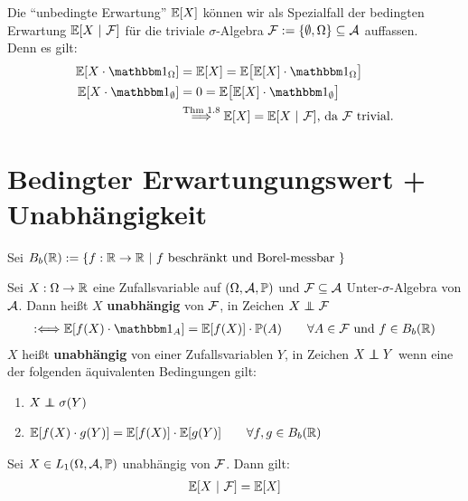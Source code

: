 \begin{bemerkung}
Die ``unbedingte Erwartung'' $\mathbb{E}[X]$ können wir als Spezialfall der bedingten Erwartung $\mathbb{E}[X~|~\mathcal{F}]$ für die triviale $\sigma$-Algebra $\mathcal{F}:=\lbrace\emptyset,\Omega\rbrace\subseteq\mathcal{A}$ auffassen.\\
Denn es gilt:
\begin{align*}
\E[X\cdot\indi_\Omega]&=\E[X]=\E\big[\E[X]\cdot\indi_\Omega\big]\\
\E[X\cdot\indi_\emptyset]&=0=\E\big[\E[X]\cdot\indi_\emptyset\big]\\
&\stackrel{\text{Thm 1.8}}{\Longrightarrow}
\E[X]=\E[X~|~\F]\text{, da $\F$ trivial.}
\end{align*}
\end{bemerkung}

\section*{Bedingter Erwartungungswert + Unabhängigkeit} %
Sei $B_b(\mathbb{R}):= \{f:\mathbb{R}\rightarrow\mathbb{R} ~|~f \text{ beschränkt und Borel-messbar }\}$
\begin{defi}
Sei $X:\Omega\to\mathbb{R}$ eine Zufallsvariable auf $(\Omega,\mathcal{A},\mathbb{P})$ und $\mathcal{F}\subseteq\mathcal{A}$ Unter-$\sigma$-Algebra von $\mathcal{A}$. Dann heißt $X$ \textbf{unabhängig} von $\mathcal{F}$, in Zeichen $X\unab\F$
\begin{align}\label{sigmaAlgebraUnabhaengig}
:\Longleftrightarrow
\E[f(X)\cdot\indi_A]
=
\E[f(X)]\cdot\P(A)\qquad\forall A\in\F\text{ und $f\in B_b(\R)$}
\end{align}
$X$ heißt \textbf{unabhängig} von einer Zufallsvariablen $Y$, in Zeichen $X\unab Y$ wenn eine der folgenden äquivalenten Bedingungen gilt:
\begin{enumerate}[label=(\alph*)]
\item $X\unab\sigma(Y)$
\item 
$\begin{aligned}
\mathbb{E}[f(X)\cdot g(Y)]
=
\mathbb{E}[f(X)]\cdot\mathbb{E}[g(Y)]\qquad\forall f,g\in B_b(\mathbb{R})
\end{aligned}$
\end{enumerate}
\end{defi}

\begin{theorem} %
Sei $X\in L_1(\Omega,\mathcal{A},\mathbb{P})$ unabhängig von $\mathcal{F}$. Dann gilt:
\begin{align*}
\mathbb{E}[X~|~\mathcal{F}]=\mathbb{E}[X]
\end{align*}
\end{theorem}

